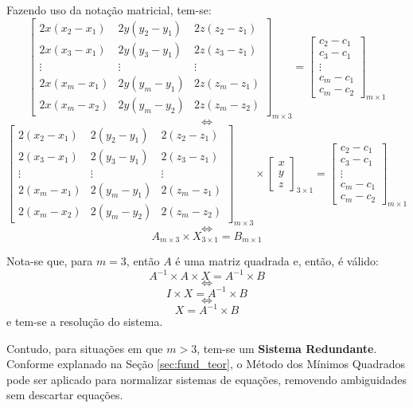	Fazendo uso da notação matricial, tem-se:
	\[
	\begin{bmatrix}
		2x(x_2-x_1) & 2y(y_2-y_1) & 2z(z_2-z_1)\\
		2x(x_3-x_1) & 2y(y_3-y_1) & 2z(z_3-z_1)\\
		\vdots & \vdots & \vdots\\
		2x(x_m-x_1) & 2y(y_m-y_1) & 2z(z_m-z_1)\\
		2x(x_m-x_2) & 2y(y_m-y_2) & 2z(z_m-z_2)
	\end{bmatrix}_{m\times3}
	=
	\begin{bmatrix}
		c_2-c_1\\
		c_3-c_1\\
		\vdots\\
		c_m-c_1\\
		c_m-c_2
	\end{bmatrix}_{m\times1}
	\]
	$$\iff$$
	\[
	\begin{bmatrix}
		2(x_2-x_1) & 2(y_2-y_1) & 2(z_2-z_1)\\
		2(x_3-x_1) & 2(y_3-y_1) & 2(z_3-z_1)\\
		\vdots & \vdots & \vdots\\
		2(x_m-x_1) & 2(y_m-y_1) & 2(z_m-z_1)\\
		2(x_m-x_2) & 2(y_m-y_2) & 2(z_m-z_2)
	\end{bmatrix}_{m\times3}
	\times
	\begin{bmatrix}
		x\\
		y\\
		z
	\end{bmatrix}_{3\times1}
	=
	\begin{bmatrix}
		c_2-c_1\\
		c_3-c_1\\
		\vdots\\
		c_m-c_1\\
		c_m-c_2
	\end{bmatrix}_{m\times1}
	\]
	$$\iff$$
	\begin{equation}A_{m\times3} \times X_{3\times1} = B_{m\times1}\label{eq:res}\end{equation}

	Nota-se que, para $m=3$, então $A$ é uma matriz quadrada e, então, é válido:
	\[A^{-1}\times A \times X = A^{-1}\times B\]
	$$\iff$$
	\[I \times X = A^{-1}\times B \]
	$$\iff$$
	\[X = A^{-1}\times B\]
	e tem-se a resolução do sistema.

	Contudo, para situações em que $m>3$, tem-se um \textbf{Sistema Redundante}. Conforme explanado na
	Seção \ref{sec:fund_teor}, o Método dos Mínimos Quadrados pode ser aplicado
	para normalizar sistemas de equações, removendo ambiguidades sem descartar equações.

